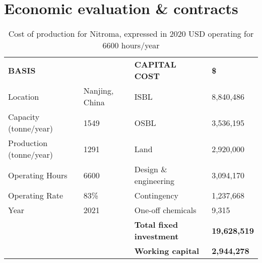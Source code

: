 \section{Economic evaluation \& contracts}

\begin{table}[H]
\centering
\caption{Cost of production for Nitroma, expressed in 2020 USD operating for 6600 hours/year}
\label{Cost_of_production}
\begin{tabular}{llllll}
\hline
\multicolumn{2}{l}{\textbf{BASIS}}                              & \textbf{}                             & \multicolumn{2}{l}{\textbf{CAPITAL COST}}              & \textbf{\$}          \\ \cline{1-2} \cline{4-6} 
Location                                & \multicolumn{2}{l}{Nanjing, China}                            & \multicolumn{2}{l}{ISBL}                               & 8,840,486            \\
Capacity (tonne/year)                   & 1549                  &                                       & \multicolumn{2}{l}{OSBL}                               & 3,536,195            \\
Production (tonne/year)                 & 1291                  &                                       & \multicolumn{2}{l}{Land}                               & 2,920,000            \\
Operating Hours                         & 6600                  &                                       & \multicolumn{2}{l}{Design \& engineering}              & 3,094,170            \\
Operating Rate                          & 83\%                  &                                       & \multicolumn{2}{l}{Contingency}                        & 1,237,668            \\
Year                                    & 2021                  &                                       & \multicolumn{2}{l}{One-off chemicals}                  & 9,315                \\ \cline{6-6} 
                                        &                       &                                       & \multicolumn{2}{l}{\textbf{Total fixed investment}}    & \textbf{19,628,519}  \\
                                        &                       &                                       & \multicolumn{2}{l}{\textbf{Working capital}}           & \textbf{2,944,278}   \\ \cline{6-6} 

\end{tabular}
\end{table}

